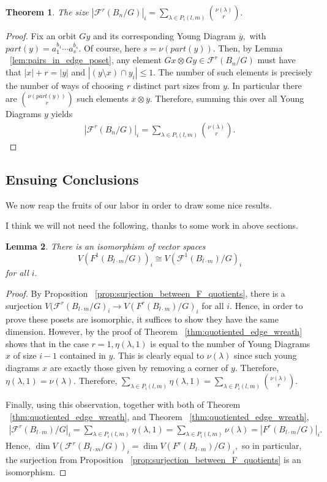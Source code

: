 \documentclass{amsart}
\newtheorem{thm}{Theorem}[subsection]
\newtheorem{lem}[thm]{Lemma}
\theoremstyle{remark}
\newcommand\ssec{\subsection}
\begin{document}
\begin{thm}
\label{thm:edge_of_quotiented_wreath}
The size $|\mathcal F^r(B_n/G)|_i = \sum_{\lambda \in P_i(l,m)} \binom{\nu(\lambda)} r.$
\end{thm}
\begin{proof}
Fix an orbit $Gy$ and its corresponding Young Diagram $\overline{y},$ with $part(y) = a_1^{b_1}\cdots a_s^{b_s}.$ Of course, here $s = \nu(part(y)).$ Then, by Lemma ~\ref{lem:pairs_in_edge_poset}, any element $Gx \otimes Gy \in \mathcal F^r(B_n/G)$ must have that $|x| +r = |y|$ and $|(y \setminus x)\cap y_i| \leq 1.$ The number of such elements is precisely the number of ways of choosing $r$ distinct part sizes from $y.$ In particular there are $\binom{\nu(part(y))} r$ such elements $\overline{x} \otimes \overline{y}.$ Therefore, summing this over all Young Diagrams $y$ yields
\begin{align*}
|\mathcal F^r(B_n/G)|_i = \sum_{\lambda \in P_i(l,m)} \binom{\nu(\lambda)} r.
\end{align*}
\end{proof}
\fi
\ssec{Ensuing Conclusions}
We now reap the fruits of our labor in order to draw some nice results.

\iffalse
I think we will not need the following, thanks to some work in above sections.
\begin{lem}
\label{lem:wreath_1_isom}
There is an isomorphism of vector spaces $$V(F^1(B_{l\cdot m}/G))_i \cong V(\mathcal F^1(B_{l\cdot m})/G)_i$$ for all $i.$
\end{lem}
\begin{proof}
By Proposition ~\ref{prop:surjection_between_F_quotients}, there is a surjection $V(\mathcal F^r(B_{l\cdot m}/G)_i \rightarrow V(F^r(B_{l\cdot m})/G)_i$ for all $i.$ Hence, in order to prove these posets are isomorphic, it suffices to show they have the same dimension. However, by the proof of Theorem ~\ref{thm:quotiented_edge_wreath} shows that in the case $r = 1,\eta(\lambda,1)$ is equal to the number of Young Diagrams $x$ of size $i-1$ contained in $y.$ This is clearly equal to $\nu(\lambda)$ since such young diagrams $x$ are exactly those given by removing a corner of $y.$ Therefore, $\eta(\lambda,1) = \nu(\lambda).$ Therefore, $\sum_{\lambda \in P_i(l,m)} \eta(\lambda,1) = \sum_{\lambda \in P_i(l,m)} \binom{\nu(\lambda)} r.$

Finally, using this observation, together with both of Theorem ~\ref{thm:quotiented_edge_wreath}, and Theorem ~\ref{thm:quotiented_edge_wreath}, 
\begin{align*}
|\mathcal F^r(B_{l\cdot m})/G|_i =\sum_{\lambda \in P_i(l,m)} \eta(\lambda,1) = \sum_{\lambda \in P_i(l,m)}\nu(\lambda) = |F^r(B_{l\cdot m}/G)|_i.
\end{align*}
Hence,  $\dim V(\mathcal F^r(B_{l\cdot m}/G))_i = \dim V(F^r(B_{l\cdot m})/G)_i,$ so in particular, the surjection from Proposition ~\ref{prop:surjection_between_F_quotients} is an isomorphism.
\end{proof}
\end{document}
